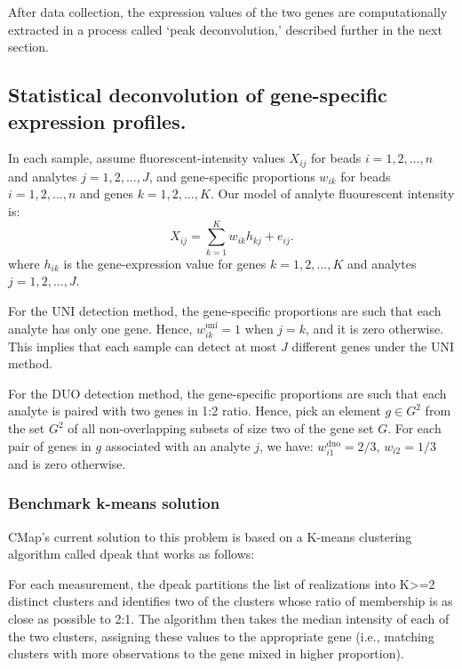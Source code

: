 \documentclass[]{article}
\begin{document}
After data collection, the expression values of the two genes are
computationally extracted in a process called `peak deconvolution,'
described further in the next section.

\hypertarget{statistical-deconvolution-of-gene-specific-expression-profiles.-1}{%
\subsection{Statistical deconvolution of gene-specific expression
profiles.}\label{statistical-deconvolution-of-gene-specific-expression-profiles.-1}}

In each sample, assume fluorescent-intensity values \(X_{ij}\) for beads
\(i=1,2,\dots, n\) and analytes \(j=1,2,\dots, J\), and gene-specific
proportions \(w_{ik}\) for beads \(i=1,2,\dots, n\) and genes
\(k=1,2,\dots, K\). Our model of analyte fluourescent intensity is: \[
  X_{ij} = \sum_{k=1}^{K} w_{ik} h_{kj} + e_{ij}. 
\] where \(h_{ik}\) is the gene-expression value for genes
\(k=1,2,\dots, K\) and analytes \(j=1,2,\dots, J\).

For the UNI detection method, the gene-specific proportions are such
that each analyte has only one gene. Hence, \(w^{\text{uni}}_{ik} = 1\)
when \(j = k\), and it is zero otherwise. This implies that each sample
can detect at most \(J\) different genes under the UNI method.

For the DUO detection method, the gene-specific proportions are such
that each analyte is paired with two genes in 1:2 ratio. Hence, pick an
element \(g\in G^2\) from the set \(G^2\) of all non-overlapping subsets
of size two of the gene set \(G\). For each pair of genes in \(g\)
associated with an analyte \(j\), we have:
\(w^{\text{duo}}_{i1} = 2/3\), \(w_{i2}=1/3\) and is zero otherwise.

\hypertarget{benchmark-k-means-solution-1}{%
\subsubsection{Benchmark k-means
solution}\label{benchmark-k-means-solution-1}}

CMap's current solution to this problem is based on a K-means clustering
algorithm called dpeak that works as follows:

For each measurement, the dpeak partitions the list of realizations into
K\textgreater=2 distinct clusters and identifies two of the clusters
whose ratio of membership is as close as possible to 2:1. The algorithm
then takes the median intensity of each of the two clusters, assigning
these values to the appropriate gene (i.e., matching clusters with more
observations to the gene mixed in higher proportion).
\end{document}
